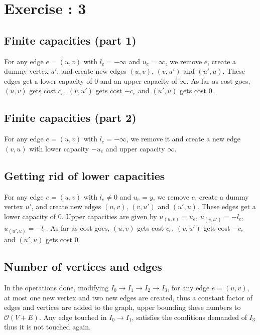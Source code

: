 
\section{Exercise : 3}

\subsection{Finite capacities (part 1)}
For any edge $e = (u, v)$ with $l_e = -\infty$ and $u_e = \infty$, we remove $e$, create a dummy vertex $u'$, and create new edges $(u, v)$, $(v, u')$ and $(u', u)$. These edges get a lower capacity of $0$ and an upper capacity of $\infty$. As far as cost goes, $(u, v)$ gets cost $c_e$, $(v, u')$ gets cost $-c_e$ and $(u', u)$ gets cost 0.

\subsection{Finite capacities (part 2)}
For any edge $e = (u, v)$ with $l_e = -\infty$, we remove it and create a new edge $(v, u)$ with lower capacity $-u_e$ and upper capacity $\infty$.

\subsection{Getting rid of lower capacities}
For any edge $e = (u, v)$ with $l_e \neq 0$ and $u_e = y$, we remove $e$, create a dummy vertex $u'$, and create new edges $(u, v)$, $(v, u')$ and $(u', u)$. These edges get a lower capacity of $0$.
Upper capacities are given by $u_{(u,v)} = u_e$, $u_{(v,u')} = -l_e$, $u_{(u',u)} = -l_e$.
As far as cost goes, $(u, v)$ gets cost $c_e$, $(v, u')$ gets cost $-c_e$ and $(u', u)$ gets cost 0.

\subsection{Number of vertices and edges}
In the operations done, modifying $I_0 \rightarrow I_1 \rightarrow I_2 \rightarrow I_3$, for any edge $e = (u,v)$, at most one new vertex and two new edges are created, thus a constant factor of edges and vertices are added to the graph, upper bounding these numbers to $\mathcal{O}(V+E)$.
Any edge touched in $I_0 \rightarrow I_1$, satisfies the conditions demanded of $I_3$ thus it is not touched again.